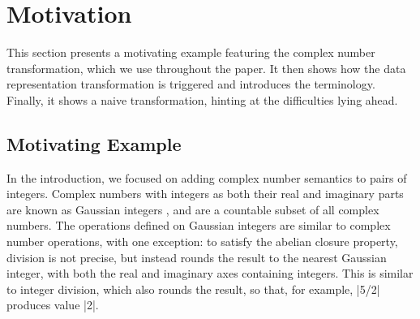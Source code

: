 \section{Motivation}
\label{sec:problem}

This section presents a motivating example featuring the complex number transformation, which we use throughout the paper. It then shows how the data representation transformation is triggered and introduces the terminology. Finally, it shows a naive transformation, hinting at the difficulties lying ahead.

\subsection{Motivating Example}

In the introduction, we focused on adding complex number semantics to
pairs of integers. Complex numbers with integers as both their real
and imaginary parts are known as Gaussian integers
\cite{gauss1828theoria,gaussian-integers-wikipedia}, and are a
countable subset of all complex numbers. The operations defined on
Gaussian integers are similar to complex number operations, with one
exception: to satisfy the abelian closure property, division is not precise,
but instead rounds the result to the nearest Gaussian integer, with both the real and imaginary
axes containing integers. This is similar to integer division, which
also rounds the result, so that, for example, |5/2| produces value
|2|.


